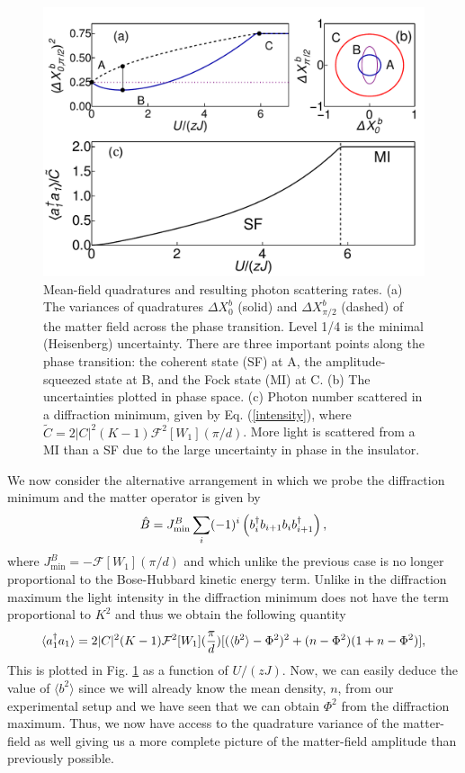 \begin{figure}
  \centering
  \includegraphics[width=\linewidth]{QuadsC}
  \caption[Mean-Field Matter Quadratures]{Mean-field quadratures and
    resulting photon scattering rates. (a) The variances of
    quadratures $\Delta X^b_0$ (solid) and $\Delta X^b_{\pi/2}$
    (dashed) of the matter field across the phase transition. Level
    1/4 is the minimal (Heisenberg) uncertainty. There are three
    important points along the phase transition: the coherent state
    (SF) at A, the amplitude-squeezed state at B, and the Fock state
    (MI) at C. (b) The uncertainties plotted in phase space. (c)
    Photon number scattered in a diffraction minimum, given by
    Eq. (\ref{intensity}), where
    $\tilde{C} = 2 |C|^2 (K-1) \mathcal{F}^2 [W_1](\pi/d)$.  More
    light is scattered from a MI than a SF due to the large
    uncertainty in phase in the insulator.}
	\label{Quads}
\end{figure}

We now consider the alternative arrangement in which we probe the
diffraction minimum and the matter operator is given by
\begin{equation}
  \label{eq:Bmin}
  \hat{B} = J^B_\mathrm{min} \sum_i (-1)^i \left( b^\dagger_i b_{i+1} b_i
    b^\dagger_{i+1} \right),
\end{equation}
where $J^B_\mathrm{min} = - \mathcal{F}[W_1](\pi / d)$ and which
unlike the previous case is no longer proportional to the Bose-Hubbard
kinetic energy term. Unlike in the diffraction maximum the light
intensity in the diffraction minimum does not have the term
proportional to $K^2$ and thus we obtain the following quantity
\begin{equation}
  \label{intensity}
  \langle a^\dagger_1 a_1 \rangle = 2 |C|^2(K-1) \mathcal{F}^2[W_1]
  (\frac{\pi}{d}) [ ( \langle b^2 \rangle - \Phi^2 )^2 + ( n - \Phi^2 ) ( 1 +n - \Phi^2 ) ],
\end{equation}
This is plotted in Fig. \ref{Quads} as a function of
$U/(zJ)$. Now, we can easily deduce the value of
$\langle b^2 \rangle$ since we will already know the mean density,
$n$, from our experimental setup and we have seen that we can obtain
$\Phi^2$ from the diffraction maximum. Thus, we now have access to the
quadrature variance of the matter-field as well giving us a more
complete picture of the matter-field amplitude than previously
possible.

